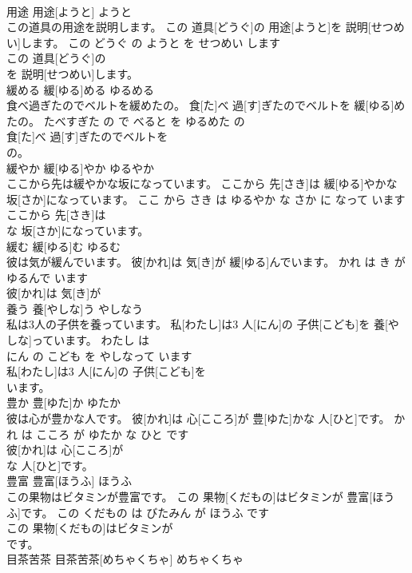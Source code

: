 \documentclass[8pt]{extreport}
\begin{document}
\begin{CJK}{UTF8}{min}
\\	用途	用途[ようと]	ようと	
\\	この道具の用途を説明します。	この 道具[どうぐ]の 用途[ようと]を 説明[せつめい]します。	この どうぐ の ようと を せつめい します	
\\	この 道具[どうぐ]の
\\	を 説明[せつめい]します。			
\\	緩める	緩[ゆる]める	ゆるめる	
\\	食べ過ぎたのでベルトを緩めたの。	食[た]べ 過[す]ぎたのでベルトを 緩[ゆる]めたの。	たべすぎた の で べると を ゆるめた の	
\\	食[た]べ 過[す]ぎたのでベルトを
\\	の。			
\\	緩やか	緩[ゆる]やか	ゆるやか	
\\	ここから先は緩やかな坂になっています。	ここから 先[さき]は 緩[ゆる]やかな 坂[さか]になっています。	ここ から さき は ゆるやか な さか に なって います	
\\	ここから 先[さき]は
\\	な 坂[さか]になっています。			
\\	緩む	緩[ゆる]む	ゆるむ	
\\	彼は気が緩んでいます。	彼[かれ]は 気[き]が 緩[ゆる]んでいます。	かれ は き が ゆるんで います	
\\	彼[かれ]は 気[き]が
\\	養う	養[やしな]う	やしなう	
\\	私は3人の子供を養っています。	私[わたし]は3 人[にん]の 子供[こども]を 養[やしな]っています。	わたし は 
\\	にん の こども を やしなって います	
\\	私[わたし]は3 人[にん]の 子供[こども]を
\\	います。			
\\	豊か	豊[ゆた]か	ゆたか	
\\	彼は心が豊かな人です。	彼[かれ]は 心[こころ]が 豊[ゆた]かな 人[ひと]です。	かれ は こころ が ゆたか な ひと です	
\\	彼[かれ]は 心[こころ]が
\\	な 人[ひと]です。			
\\	豊富	豊富[ほうふ]	ほうふ	
\\	この果物はビタミンが豊富です。	この 果物[くだもの]はビタミンが 豊富[ほうふ]です。	この くだもの は びたみん が ほうふ です	
\\	この 果物[くだもの]はビタミンが
\\	です。			
\\	目茶苦茶	目茶苦茶[めちゃくちゃ]	めちゃくちゃ	

\end{CJK}
\end{document}
